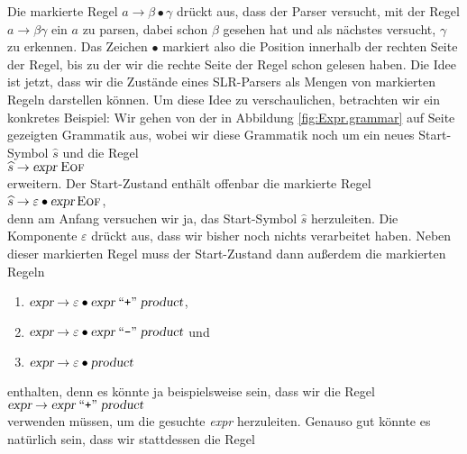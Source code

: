 \noindent
Die markierte Regel $a \rightarrow \beta \bullet \gamma$ dr\"uckt aus, dass der Parser versucht,
mit der Regel $a \rightarrow \beta \gamma$ ein $a$ zu parsen, dabei schon $\beta$ gesehen
hat und als n\"achstes versucht, $\gamma$ zu erkennen.  Das Zeichen $\bullet$ markiert also die
Position innerhalb der rechten Seite der Regel, bis zu der wir die rechte Seite der Regel
schon gelesen haben.
Die Idee ist jetzt, dass wir die Zust\"ande eines SLR-Parsers als Mengen von markierten Regeln
darstellen k\"onnen.  Um diese Idee zu verschaulichen, betrachten wir ein konkretes Beispiel:
Wir gehen von der in Abbildung \ref{fig:Expr.grammar} auf Seite \pageref{fig:Expr.grammar}
gezeigten Grammatik aus, wobei wir diese Grammatik noch um ein neues Start-Symbol $\widehat{s}$
und die Regel
\\[0.2cm]
\hspace*{1.3cm} $\widehat{s} \rightarrow  \textsl{expr}\;\textsc{Eof}$
\\[0.2cm]
erweitern.  Der Start-Zustand enth\"alt offenbar die markierte Regel
\\[0.2cm]
\hspace*{1.3cm} $\widehat{s} \rightarrow \varepsilon \bullet \textsl{expr}\, \textsc{Eof}$,
\\[0.2cm]
denn am Anfang versuchen wir ja, das Start-Symbol $\widehat{s}$ herzuleiten.  Die Komponente
$\varepsilon$ dr\"uckt aus, dass wir bisher noch nichts verarbeitet haben.  Neben dieser
markierten Regel muss der Start-Zustand dann au{\ss}erdem die markierten Regeln
\begin{enumerate}
\item $\textsl{expr} \rightarrow \varepsilon \bullet \textsl{expr} \;\mbox{``\texttt{+}''}\; \textsl{product}$,
\item $\textsl{expr} \rightarrow \varepsilon \bullet \textsl{expr} \;\mbox{``\texttt{-}''}\; \textsl{product}$
      \qquad und
\item $\textsl{expr} \rightarrow \varepsilon \bullet \textsl{product}$
\end{enumerate}
enthalten, denn es k\"onnte ja beispielsweise sein, dass wir die Regel
\\[0.2cm]
\hspace*{1.3cm}
$\textsl{expr} \rightarrow \textsl{expr} \;\mbox{``\texttt{+}''}\; \textsl{product}$
\\[0.2cm]  
verwenden m\"ussen, um die gesuchte \textsl{expr} herzuleiten.  Genauso gut k\"onnte es nat\"urlich sein,
dass wir stattdessen die Regel
\\[0.2cm]
\hspace*{1.3cm}
